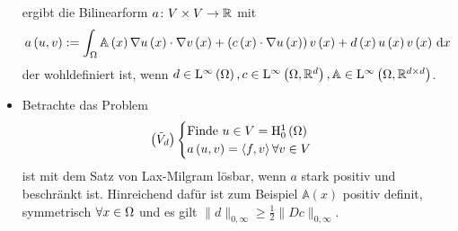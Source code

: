 \begin{expl}
\begin{itemize}
\begin{equation*}
			\end{equation*}
			ergibt die Bilinearform $a\colon V\times V\to\mathbb{R}$ mit
			\begin{equation*}
				a\left(u,v\right) := \int_{\Omega} \mathbb{A}\left(x\right)\nabla u\left(x\right)\cdot\nabla v\left(x\right) + \left(c\left(x\right)\cdot\nabla u\left(x\right)\right)v\left(x\right) + d\left(x\right)u\left(x\right)v\left(x\right)\,\mathrm{d} x
			\end{equation*}
			der wohldefiniert ist, wenn $d\in\mathrm{L}^{\infty}\left(\Omega\right), c\in\mathrm{L}^{\infty}\left(\Omega,\mathbb{R}^{d}\right),\mathbb{A}\in\mathrm{L}^{\infty}\left(\Omega,\mathbb{R}^{d\times d}\right)$.{}
		\item Betrachte das Problem
			\begin{equation*}
				\left(\tilde{V}_{d}\right) \begin{cases}
					\text{Finde }u\in V=\mathrm{H}^{1}_{0}\left(\Omega\right)\\
					a\left(u,v\right) = \left<f,v\right> \forall v\in V
				\end{cases}
			\end{equation*}
			ist mit dem Satz von Lax-Milgram lösbar, wenn $a$ stark positiv und beschränkt ist. Hinreichend dafür ist zum Beispiel $\mathbb{A}\left(x\right)$ positiv definit, symmetrisch $\forall x\in\Omega$ und es gilt $\|d\|_{0,\infty} \geq \frac{1}{2}\|Dc\|_{0,\infty}$.
	\end{itemize}
\end{expl}
